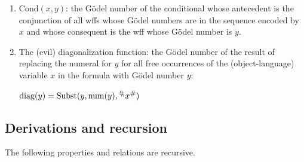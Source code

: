 \documentclass[12pt]{report}
\theoremstyle{nonumberplain}
\newcommand{\Gn}[1]{{^{\reflectbox{\footnotesize\#}}}{#1}{^{\mbox{\footnotesize\#}}}}
\begin{document}
\begin{enumerate}[label=(\alph*)]
\item $\mathrm{Cond}(x,y)$: the Gödel number of the conditional whose antecedent is the conjunction of all wffs whose Gödel numbers are in the sequence encoded by $x$ and whose consequent is the wff whose Gödel number is $y$.

\item \label{diagevil}The (evil) diagonalization function: the Gödel number of the result of replacing the numeral for $y$ for all free occurrences of the (object-language) variable $x$ in the formula with Gödel number $y$:

$\mathrm{diag}(y) = \mathrm{Subst}(y,\mathrm{num}(y),\Gn{x})$

\end{enumerate}

\subsection*{Derivations and recursion}

\begin{mt}
The following properties and relations are recursive.
\end{mt}
\end{document}
